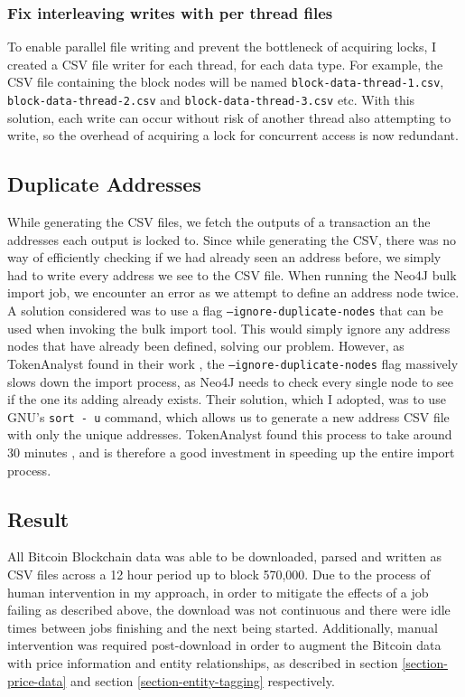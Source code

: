 \subsubsection{Fix interleaving writes with per thread files} 
To enable parallel file writing and prevent the bottleneck of acquiring locks, I created a CSV file writer for each thread, for each data type. For example, the CSV file containing the block nodes will be named \texttt{block-data-thread-1.csv}, \texttt{block-data-thread-2.csv} and \texttt{block-data-thread-3.csv} etc. With this solution, each write can occur without risk of another thread also attempting to write, so the overhead of acquiring a lock for concurrent access is now redundant. 

\subsection{Duplicate Addresses}
While generating the CSV files, we fetch the outputs of a transaction an the addresses each output is locked to. Since while generating the CSV, there was no way of efficiently checking if we had already seen an address before, we simply had to write every address we see to the CSV file. When running the Neo4J bulk import job, we encounter an error as we attempt to define an address node twice. A solution considered was to use a flag \texttt{--ignore-duplicate-nodes} that can be used when invoking the bulk import tool. This would simply ignore any address nodes that have already been defined, solving our problem. However, as TokenAnalyst found in their work \cite{RefWorks:doc:5c98e0cde4b044512c0b8641}, the \texttt{--ignore-duplicate-nodes} flag massively slows down the import process, as Neo4J needs to check every single node to see if the one its adding already exists. Their solution, which I adopted, was to use GNU's \texttt{sort - u} command, which allows us to generate a new address CSV file with only the unique addresses. TokenAnalyst found this process to take around 30 minutes \cite{RefWorks:doc:5c98e0cde4b044512c0b8641}, and is therefore a good investment in speeding up the entire import process. 


\subsection{Result}
All Bitcoin Blockchain data was able to be downloaded, parsed and written as CSV files across a 12 hour period up to block 570,000. Due to the process of human intervention in my approach, in order to mitigate the effects of a job failing as described above, the download was not continuous and there were idle times between jobs finishing and the next being started. Additionally, manual intervention was required post-download in order to augment the Bitcoin data with price information and entity relationships, as described in section \ref{section-price-data} and section \ref{section-entity-tagging} respectively. 